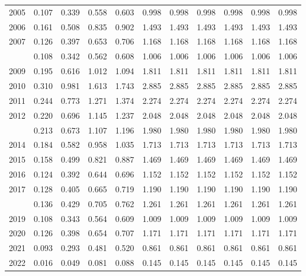 \documentclass[
]{article}
\begin{document}
\begin{longtable}[t]{lrrrrrrrrrr}
2005 & 0.107 & 0.339 & 0.558 & 0.603 & 0.998 & 0.998 & 0.998 & 0.998 & 0.998 & 0.998\\
2006 & 0.161 & 0.508 & 0.835 & 0.902 & 1.493 & 1.493 & 1.493 & 1.493 & 1.493 & 1.493\\
2007 & 0.126 & 0.397 & 0.653 & 0.706 & 1.168 & 1.168 & 1.168 & 1.168 & 1.168 & 1.168\\
\addlinespace
2008 & 0.108 & 0.342 & 0.562 & 0.608 & 1.006 & 1.006 & 1.006 & 1.006 & 1.006 & 1.006\\
2009 & 0.195 & 0.616 & 1.012 & 1.094 & 1.811 & 1.811 & 1.811 & 1.811 & 1.811 & 1.811\\
2010 & 0.310 & 0.981 & 1.613 & 1.743 & 2.885 & 2.885 & 2.885 & 2.885 & 2.885 & 2.885\\
2011 & 0.244 & 0.773 & 1.271 & 1.374 & 2.274 & 2.274 & 2.274 & 2.274 & 2.274 & 2.274\\
2012 & 0.220 & 0.696 & 1.145 & 1.237 & 2.048 & 2.048 & 2.048 & 2.048 & 2.048 & 2.048\\
\addlinespace
2013 & 0.213 & 0.673 & 1.107 & 1.196 & 1.980 & 1.980 & 1.980 & 1.980 & 1.980 & 1.980\\
2014 & 0.184 & 0.582 & 0.958 & 1.035 & 1.713 & 1.713 & 1.713 & 1.713 & 1.713 & 1.713\\
2015 & 0.158 & 0.499 & 0.821 & 0.887 & 1.469 & 1.469 & 1.469 & 1.469 & 1.469 & 1.469\\
2016 & 0.124 & 0.392 & 0.644 & 0.696 & 1.152 & 1.152 & 1.152 & 1.152 & 1.152 & 1.152\\
2017 & 0.128 & 0.405 & 0.665 & 0.719 & 1.190 & 1.190 & 1.190 & 1.190 & 1.190 & 1.190\\
\addlinespace
2018 & 0.136 & 0.429 & 0.705 & 0.762 & 1.261 & 1.261 & 1.261 & 1.261 & 1.261 & 1.261\\
2019 & 0.108 & 0.343 & 0.564 & 0.609 & 1.009 & 1.009 & 1.009 & 1.009 & 1.009 & 1.009\\
2020 & 0.126 & 0.398 & 0.654 & 0.707 & 1.171 & 1.171 & 1.171 & 1.171 & 1.171 & 1.171\\
2021 & 0.093 & 0.293 & 0.481 & 0.520 & 0.861 & 0.861 & 0.861 & 0.861 & 0.861 & 0.861\\
2022 & 0.016 & 0.049 & 0.081 & 0.088 & 0.145 & 0.145 & 0.145 & 0.145 & 0.145 & 0.145\\*
\end{longtable}
\end{document}
